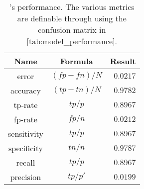\begin{table}
    \centering
    \begin{tabular}{|c|c|r|}\hline
    Name        & Formula       &   Result      \\\hline
    error       & $(fp+fn)/N$   &   $0.0217$    \\
    accuracy    & $(tp+tn)/N$   &   $0.9782$    \\\hline
    tp-rate     & $tp/p$        &   $0.8967$    \\
    fp-rate     & $fp/n$        &   $0.0212$    \\\hline
    sensitivity & $tp/p$        &   $0.8967$    \\
    specificity & $tn/n$        &   $0.9787$    \\\hline
    recall      & $tp/p$        &   $0.8967$    \\
    precision   & $tp/p'$       &   $0.0199$    \\\hline
    \end{tabular}
    \caption[\project's performance]{\project's performance. The various metrics are definable through using the confusion matrix in \autoref{tab:model_performance}.}
    \label{tab:performance}
\end{table}